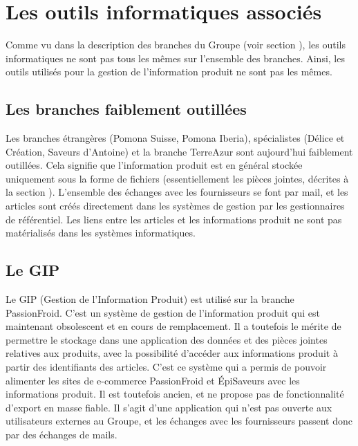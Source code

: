        \section{Les outils informatiques associés}
        \label{outils_infos}

        Comme vu dans la description des branches du Groupe (voir section ), les outils informatiques ne sont pas tous les mêmes sur l'ensemble des branches.
        Ainsi, les outils utilisés pour la gestion de l'information produit ne sont pas les mêmes.

            \subsection{Les branches faiblement outillées}
            
            Les branches étrangères (Pomona Suisse, Pomona Iberia), spécialistes (Délice et Création, Saveurs d'Antoine) et la branche TerreAzur sont aujourd'hui faiblement outillées.
            Cela signifie que l'information produit est en général stockée uniquement sous la forme de fichiers (essentiellement les pièces jointes, décrites à la section ).
            L'ensemble des échanges avec les fournisseurs se font par mail, et les articles sont créés directement dans les systèmes de gestion par les gestionnaires de référentiel.
            Les liens entre les articles et les informations produit ne sont pas matérialisés dans les systèmes informatiques.

            \subsection{Le GIP}
            \label{GIP}

            Le GIP (Gestion de l'Information Produit) est utilisé sur la branche PassionFroid.
            C'est un système de gestion de l'information produit qui est maintenant obsolescent et en cours de remplacement.
            Il a toutefois le mérite de permettre le stockage dans une application des données et des pièces jointes relatives aux produits, avec la possibilité d'accéder aux informations produit à partir des identifiants des articles.
            C'est ce système qui a permis de pouvoir alimenter les sites de e-commerce PassionFroid et \'{E}piSaveurs avec les informations produit.
            Il est toutefois ancien, et ne propose pas de fonctionnalité d'export en masse fiable.
            Il s'agit d'une application qui n'est pas ouverte aux utilisateurs externes au Groupe, et les échanges avec les fournisseurs passent donc par des échanges de mails.

